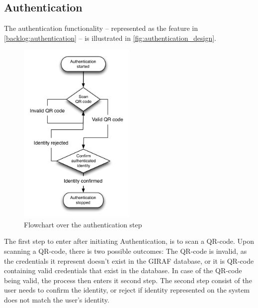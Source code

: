 \subsection{Authentication}
\label{design:authentication}
The authentication functionality -- represented as the  feature in \autoref{backlog:authentication} -- is illustrated in \autoref{fig:authentication_design}. 
\begin{figure}[h]
	\centering
	\includegraphics[width=0.5\textwidth]{gfx/authentication_design.pdf}
	\caption{Flowchart over the authentication step}
	\label{fig:authentication_design}
\end{figure}
The first step to enter after initiating Authentication, is to scan a QR-code.
Upon scanning a QR-code, there is two possible outcomes: The QR-code is invalid, as the credentials it represent doesn't exist in the GIRAF database, or it is QR-code containing valid credentials that exist in the database.
In case of the QR-code being valid, the process then enters it second step. The second step consist of the user needs to confirm the identity, or reject if identity represented on the system does not match the user's identity. 

